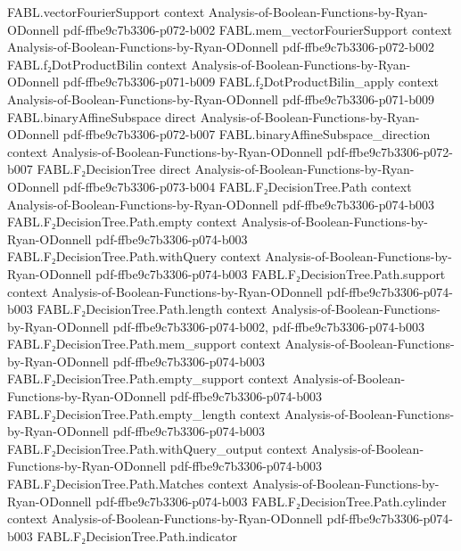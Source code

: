 \begin{theorem}
\proofstep
  {FABL.vectorFourierSupport}
  {context}
  {Analysis-of-Boolean-Functions-by-Ryan-ODonnell}
  {pdf-ffbe9c7b3306-p072-b002}
\proofstep
  {FABL.mem_vectorFourierSupport}
  {context}
  {Analysis-of-Boolean-Functions-by-Ryan-ODonnell}
  {pdf-ffbe9c7b3306-p072-b002}
\proofstep
  {FABL.f₂DotProductBilin}
  {context}
  {Analysis-of-Boolean-Functions-by-Ryan-ODonnell}
  {pdf-ffbe9c7b3306-p071-b009}
\proofstep
  {FABL.f₂DotProductBilin_apply}
  {context}
  {Analysis-of-Boolean-Functions-by-Ryan-ODonnell}
  {pdf-ffbe9c7b3306-p071-b009}
\proofstep
  {FABL.binaryAffineSubspace}
  {direct}
  {Analysis-of-Boolean-Functions-by-Ryan-ODonnell}
  {pdf-ffbe9c7b3306-p072-b007}
\proofstep
  {FABL.binaryAffineSubspace_direction}
  {context}
  {Analysis-of-Boolean-Functions-by-Ryan-ODonnell}
  {pdf-ffbe9c7b3306-p072-b007}
\proofstep
  {FABL.F₂DecisionTree}
  {direct}
  {Analysis-of-Boolean-Functions-by-Ryan-ODonnell}
  {pdf-ffbe9c7b3306-p073-b004}
\proofstep
  {FABL.F₂DecisionTree.Path}
  {context}
  {Analysis-of-Boolean-Functions-by-Ryan-ODonnell}
  {pdf-ffbe9c7b3306-p074-b003}
\proofstep
  {FABL.F₂DecisionTree.Path.empty}
  {context}
  {Analysis-of-Boolean-Functions-by-Ryan-ODonnell}
  {pdf-ffbe9c7b3306-p074-b003}
\proofstep
  {FABL.F₂DecisionTree.Path.withQuery}
  {context}
  {Analysis-of-Boolean-Functions-by-Ryan-ODonnell}
  {pdf-ffbe9c7b3306-p074-b003}
\proofstep
  {FABL.F₂DecisionTree.Path.support}
  {context}
  {Analysis-of-Boolean-Functions-by-Ryan-ODonnell}
  {pdf-ffbe9c7b3306-p074-b003}
\proofstep
  {FABL.F₂DecisionTree.Path.length}
  {context}
  {Analysis-of-Boolean-Functions-by-Ryan-ODonnell}
  {pdf-ffbe9c7b3306-p074-b002,
    pdf-ffbe9c7b3306-p074-b003}
\proofstep
  {FABL.F₂DecisionTree.Path.mem_support}
  {context}
  {Analysis-of-Boolean-Functions-by-Ryan-ODonnell}
  {pdf-ffbe9c7b3306-p074-b003}
\proofstep
  {FABL.F₂DecisionTree.Path.empty_support}
  {context}
  {Analysis-of-Boolean-Functions-by-Ryan-ODonnell}
  {pdf-ffbe9c7b3306-p074-b003}
\proofstep
  {FABL.F₂DecisionTree.Path.empty_length}
  {context}
  {Analysis-of-Boolean-Functions-by-Ryan-ODonnell}
  {pdf-ffbe9c7b3306-p074-b003}
\proofstep
  {FABL.F₂DecisionTree.Path.withQuery_output}
  {context}
  {Analysis-of-Boolean-Functions-by-Ryan-ODonnell}
  {pdf-ffbe9c7b3306-p074-b003}
\proofstep
  {FABL.F₂DecisionTree.Path.Matches}
  {context}
  {Analysis-of-Boolean-Functions-by-Ryan-ODonnell}
  {pdf-ffbe9c7b3306-p074-b003}
\proofstep
  {FABL.F₂DecisionTree.Path.cylinder}
  {context}
  {Analysis-of-Boolean-Functions-by-Ryan-ODonnell}
  {pdf-ffbe9c7b3306-p074-b003}
\proofstep
  {FABL.F₂DecisionTree.Path.indicator}

\end{theorem}
